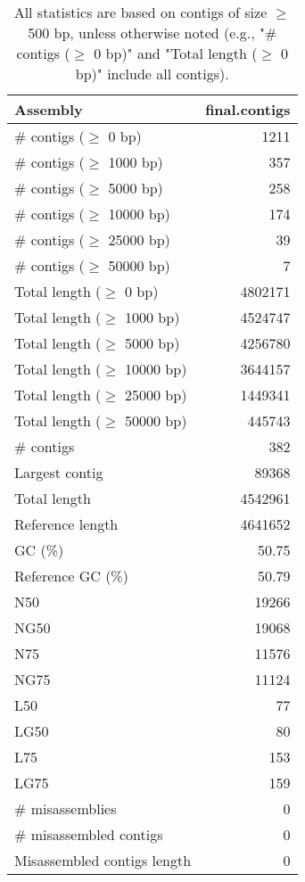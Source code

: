 \documentclass[12pt,a4paper]{article}
\begin{document}
\begin{table}[ht]
\begin{center}
\caption{All statistics are based on contigs of size $\geq$ 500 bp, unless otherwise noted (e.g., "\# contigs ($\geq$ 0 bp)" and "Total length ($\geq$ 0 bp)" include all contigs).}
\begin{tabular}{|l*{1}{|r}|}
\hline
Assembly & final.contigs \\ \hline
\# contigs ($\geq$ 0 bp) & 1211 \\ \hline
\# contigs ($\geq$ 1000 bp) & 357 \\ \hline
\# contigs ($\geq$ 5000 bp) & 258 \\ \hline
\# contigs ($\geq$ 10000 bp) & 174 \\ \hline
\# contigs ($\geq$ 25000 bp) & 39 \\ \hline
\# contigs ($\geq$ 50000 bp) & 7 \\ \hline
Total length ($\geq$ 0 bp) & 4802171 \\ \hline
Total length ($\geq$ 1000 bp) & 4524747 \\ \hline
Total length ($\geq$ 5000 bp) & 4256780 \\ \hline
Total length ($\geq$ 10000 bp) & 3644157 \\ \hline
Total length ($\geq$ 25000 bp) & 1449341 \\ \hline
Total length ($\geq$ 50000 bp) & 445743 \\ \hline
\# contigs & 382 \\ \hline
Largest contig & 89368 \\ \hline
Total length & 4542961 \\ \hline
Reference length & 4641652 \\ \hline
GC (\%) & 50.75 \\ \hline
Reference GC (\%) & 50.79 \\ \hline
N50 & 19266 \\ \hline
NG50 & 19068 \\ \hline
N75 & 11576 \\ \hline
NG75 & 11124 \\ \hline
L50 & 77 \\ \hline
LG50 & 80 \\ \hline
L75 & 153 \\ \hline
LG75 & 159 \\ \hline
\# misassemblies & 0 \\ \hline
\# misassembled contigs & 0 \\ \hline
Misassembled contigs length & 0 \\ \hline

\end{tabular}
\end{center}
\end{table}
\end{document}
